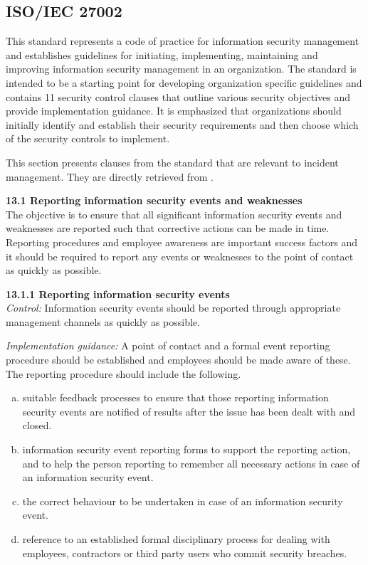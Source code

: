 \subsection{\acs{ISO}/\acs{IEC} 27002}
\label{sec:iso27002}
This standard represents a code of practice for information security management and establishes guidelines for initiating, implementing, maintaining and improving information security management in an organization. The standard is intended to be a starting point for developing organization specific guidelines and contains 11 security control clauses that outline various security objectives and provide implementation guidance. It is emphasized that organizations should initially identify and establish their security requirements and then choose which of the security controls to implement.

This section presents clauses from the standard that are relevant to incident management. They are directly retrieved from \cite{ISO/IEC27002}.

\textbf{13.1 Reporting information security events and weaknesses } \\
The objective is to ensure that all significant information security events and weaknesses are reported such that corrective actions can be made in time. Reporting procedures and employee awareness are important success factors and it should be required to report any events or weaknesses to the point of contact as quickly as possible.

\textbf{13.1.1 Reporting information security events} \\
\emph{Control:} Information security events should be reported through appropriate management channels as quickly as possible.

\emph{Implementation guidance:} A point of contact and a formal event reporting procedure should be established and employees should be made aware of these. The reporting procedure should include the following.
\begin{enumerate}[a)]
\item suitable feedback processes to ensure that those reporting information security events are notified of results after the issue has been dealt with and closed.
\item information security event reporting forms to support the reporting action, and to help the person reporting to remember all necessary actions in case of an information security event.
\item the correct behaviour to be undertaken in case of an information security event.
\item reference to an established formal disciplinary process for dealing with employees, contractors or third party users who commit security breaches.
\end{enumerate}

